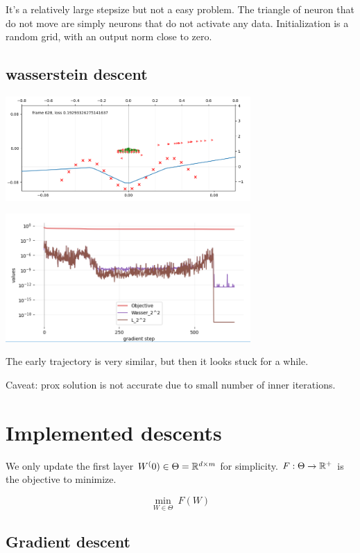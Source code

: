 It's a relatively large stepsize but not a easy problem. The triangle of neuron that do not move are simply neurons that do not activate any data. Initialization is a random grid, with an output norm close to zero.

\subsection{wasserstein descent}

\includegraphics[width=0.7\textwidth]{imgs/tau10_plot_wasser_end.png}

\includegraphics[width=0.7\textwidth]{imgs/tau10_graph_wasser.png}

The early trajectory is very similar, but then it looks stuck for a while.

Caveat: prox solution is not accurate due to small number of inner iterations.

\section{Implemented descents}

We only update the first layer $W^(0) \in \Theta = \mathbb{R}^{d \times m}$ for simplicity. $F : \Theta \rightarrow \mathbb{R}^+$ is the objective to minimize.

\begin{equation}
	\min_{W \in \Theta} \ F(W)
\end{equation}

\subsection{Gradient descent}

